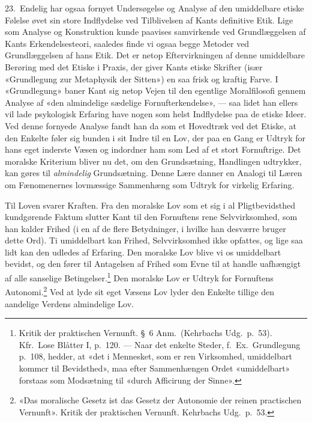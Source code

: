 \documentclass[12pt,a4paper]{article}
\begin{document}
23.\ Endelig har ogsaa fornyet Undersøgelse og Analyse af den umiddelbare
etiske Følelse øvet sin store Indflydelse ved Tilblivelsen af Kants
definitive Etik. Lige som Analyse og Konstruktion kunde paavises
samvirkende ved Grundlæggelsen af Kants Erkendelsesteori, saaledes finde
vi ogsaa begge Metoder ved Grundlæggelsen af hans Etik. Det er netop
Eftervirkningen af denne umiddelbare Berøring med det Etiske i Praxis,
der giver Kants etiske Skrifter (især «Grundlegung zur Metaphysik der
Sitten») en saa frisk og kraftig Farve. I «Grundlegung» baner Kant sig
netop Vejen til den egentlige Moralfilosofi gennem Analyse af «den
almindelige sædelige Fornufterkendelse», --- saa lidet han ellers vil
lade psykologisk Erfaring have nogen som helst Indflydelse paa de etiske
Ideer. Ved denne fornyede Analyse fandt han da som et Hovedtræk ved det
Etiske, at den Enkelte føler sig bunden i sit Indre til en Lov, der paa
en Gang er Udtryk for hans eget inderste Væsen og indordner ham som Led
af et stort Fornuftrige. Det moralske Kriterium bliver nu det, om den
Grundsætning, Handlingen udtrykker, kan gøres til \emph{almindelig} Grundsætning.
Denne Lære danner en Analogi til Læren om Fænomenernes lovmæssige
Sammenhæng som Udtryk for virkelig Erfaring.

Til Loven svarer Kraften. Fra den moralske Lov som et sig i al
Pligtbevidsthed kundgørende Faktum slutter Kant til den Fornuftens rene
Selvvirksomhed, som han kalder Frihed (i en af de flere Betydninger, i
hvilke han desværre bruger dette Ord). Ti umiddelbart kan Frihed,
Selvvirksomhed ikke opfattes, og lige saa lidt kan den udledes af
Erfaring. Den moralske Lov blive vi os umiddelbart bevidst, og den fører
til Antagelsen af Frihed som Evne til at handle uafhængigt af alle
sanselige Betingelser.\footnote{Kritik der praktischen Vernunft.
§\ 6 Anm.\ (Kehrbachs Udg.\ p.\ 53). Kfr.\ Lose Blåtter I, p.\
120. --- Naar det enkelte Steder, f.\ Ex.\ Grundlegung p.\ 108, hedder,
at «det i Mennesket, som er ren Virksomhed, umiddelbart kommcr til
Bevidsthed», maa efter Sammenhængen Ordet «umiddelbart» forstaas som
Modsætning til «durch Afficirung der Sinne».} Den moralske Lov er Udtryk
for Fornuftens Autonomi.\footnote{«Das moralische Gesetz ist das Gesetz
der Autonomie der reinen practischen Vernunft». Kritik der
praktischen Vernunft. Kehrbachs Udg.\ p.\ 53.} Ved at lyde sit eget
Væsens Lov lyder den Enkelte tillige den aandelige Verdens almindelige
Lov.
\end{document}
